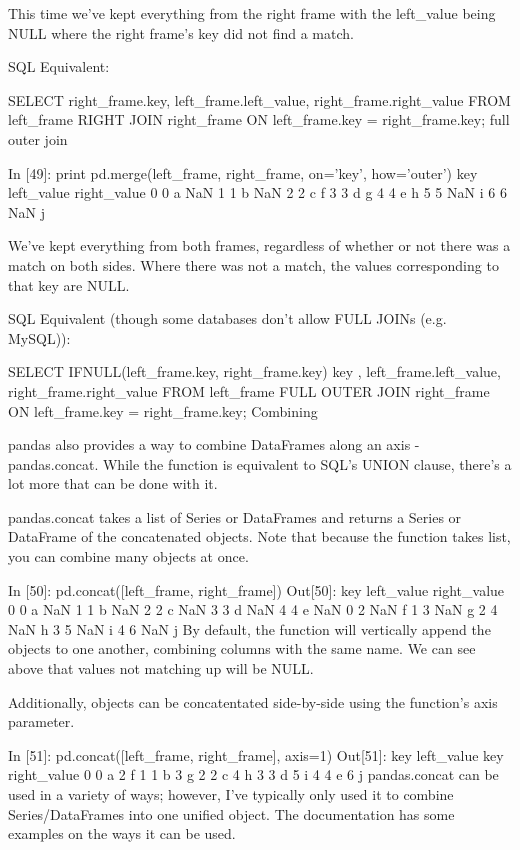 This time we've kept everything from the right frame with the left_value being NULL where the right frame's key did not find a match.

SQL Equivalent:

SELECT right_frame.key, left_frame.left_value, right_frame.right_value
FROM left_frame
RIGHT JOIN right_frame
    ON left_frame.key = right_frame.key;
full outer join

In [49]:
print pd.merge(left_frame, right_frame, on='key', how='outer')
   key left_value right_value
0    0          a         NaN
1    1          b         NaN
2    2          c           f
3    3          d           g
4    4          e           h
5    5        NaN           i
6    6        NaN           j

We've kept everything from both frames, regardless of whether or not there was a match on both sides. Where there was not a match, the values corresponding to that key are NULL.

SQL Equivalent (though some databases don't allow FULL JOINs (e.g. MySQL)):

SELECT IFNULL(left_frame.key, right_frame.key) key
        , left_frame.left_value, right_frame.right_value
FROM left_frame
FULL OUTER JOIN right_frame
    ON left_frame.key = right_frame.key;
Combining

pandas also provides a way to combine DataFrames along an axis - pandas.concat. While the function is equivalent to SQL's UNION clause, there's a lot more that can be done with it.

pandas.concat takes a list of Series or DataFrames and returns a Series or DataFrame of the concatenated objects. Note that because the function takes list, you can combine many objects at once.

In [50]:
pd.concat([left_frame, right_frame])
Out[50]:
key	left_value	right_value
0	 0	 a	 NaN
1	 1	 b	 NaN
2	 2	 c	 NaN
3	 3	 d	 NaN
4	 4	 e	 NaN
0	 2	 NaN	 f
1	 3	 NaN	 g
2	 4	 NaN	 h
3	 5	 NaN	 i
4	 6	 NaN	 j
By default, the function will vertically append the objects to one another, combining columns with the same name. We can see above that values not matching up will be NULL.

Additionally, objects can be concatentated side-by-side using the function's axis parameter.

In [51]:
pd.concat([left_frame, right_frame], axis=1)
Out[51]:
key	left_value	key	right_value
0	 0	 a	 2	 f
1	 1	 b	 3	 g
2	 2	 c	 4	 h
3	 3	 d	 5	 i
4	 4	 e	 6	 j
pandas.concat can be used in a variety of ways; however, I've typically only used it to combine Series/DataFrames into one unified object. The documentation has some examples on the ways it can be used.

